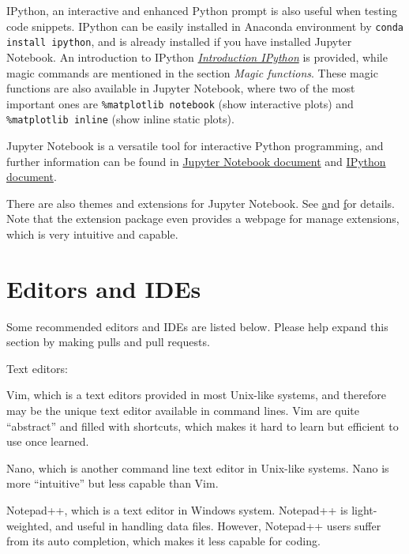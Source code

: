\documentclass[english]{../TeXTemplate/pkupaper}
\begin{document}
IPython, an interactive and enhanced Python prompt is also useful when testing code snippets. IPython can be easily installed in Anaconda environment by \verb"conda install ipython", and is already installed if you have installed Jupyter Notebook. An introduction to IPython \href{https://ipython.readthedocs.io/en/stable/interactive/tutorial.html}{\emph{Introduction IPython}} is provided, while magic commands are mentioned in the section \emph{Magic functions}. These magic functions are also available in Jupyter Notebook, where two of the most important ones are \verb"%matplotlib notebook" (show interactive plots) and \verb"%matplotlib inline" (show inline static plots).

Jupyter Notebook is a versatile tool for interactive Python programming, and further information can be found in \href{https://jupyter-notebook.readthedocs.io/en/stable/index.html}{Jupyter Notebook document} and \href{https://ipython.readthedocs.io/en/stable/index.html}{IPython document}.

There are also themes and extensions for Jupyter Notebook. See \href{https://github.com/dunovank/jupyter-themes} and \href{https://github.com/ipython-contrib/jupyter_contrib_nbextensions} for details. Note that the extension package even provides a webpage for manage extensions, which is very intuitive and capable.

\section{Editors and IDEs}

Some recommended editors and IDEs are listed below. Please help expand this section by making pulls and pull requests.

Text editors:
\begin{partlist}
\item Vim, which is a text editors provided in most Unix-like systems, and therefore may be the unique text editor available in command lines. Vim are quite ``abstract'' and filled with shortcuts, which makes it hard to learn but efficient to use once learned.
\item Nano, which is another command line text editor in Unix-like systems. Nano is more ``intuitive'' but less capable than Vim.
\item Notepad++, which is a text editor in Windows system. Notepad++ is light-weighted, and useful in handling data files. However, Notepad++ users suffer from its auto completion, which makes it less capable for coding.
\end{partlist}
\end{document}
